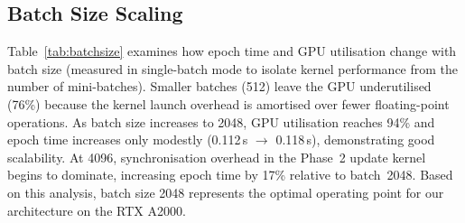 \documentclass[conference]{IEEEtran}
\begin{document}
\begin{table}[htbp]
\caption{Test Accuracy Progression Over Training Epochs}
\begin{center}
\label{tab:convergence}
\end{center}
\end{table}

\subsection{Batch Size Scaling}

Table~\ref{tab:batchsize} examines how epoch time and GPU utilisation change with batch size (measured in single-batch mode to isolate kernel performance from the number of mini-batches). Smaller batches (512) leave the GPU underutilised (76\%) because the kernel launch overhead is amortised over fewer floating-point operations. As batch size increases to 2048, GPU utilisation reaches 94\% and epoch time increases only modestly (0.112\,s $\to$ 0.118\,s), demonstrating good scalability. At 4096, synchronisation overhead in the Phase~2 update kernel begins to dominate, increasing epoch time by 17\% relative to batch~2048. Based on this analysis, batch size 2048 represents the optimal operating point for our architecture on the RTX A2000.

\begin{table}[htbp]
\caption{Batch Size Scaling — CUDA SGD, Single-Batch Mode}
\begin{center}
\label{tab:batchsize}
\end{center}
\end{table}
\end{document}
